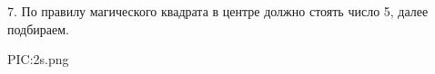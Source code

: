 7. По правилу магического квадрата в центре должно стоять число 5, далее подбираем.
\begin{center}
{{PIC:2s.png}}
\end{center}
